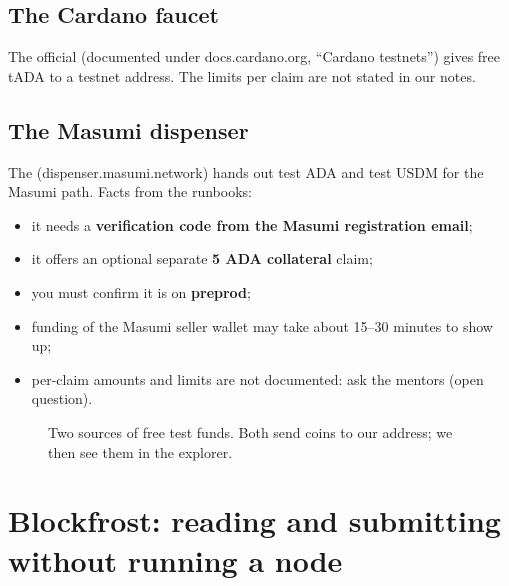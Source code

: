 \subsection{The Cardano faucet}
The official  (documented under docs.cardano.org, ``Cardano testnets'') gives free tADA to a testnet address. The limits per claim are not stated in our notes.

\subsection{The Masumi dispenser}
The  (dispenser.masumi.network) hands out test ADA and test USDM for the Masumi path. Facts from the runbooks:
\begin{itemize}
  \item it needs a \textbf{verification code from the Masumi registration email};
  \item it offers an optional separate \textbf{5 ADA collateral} claim;
  \item you must confirm it is on \textbf{preprod};
  \item funding of the Masumi seller wallet may take about 15--30 minutes to show up;
  \item per-claim amounts and limits are not documented: ask the mentors (open question).
\end{itemize}

\begin{figure}[h]
\centering
{}
\caption{Two sources of free test funds. Both send coins to our address; we then see them in the explorer.}
\end{figure}

\section{Blockfrost: reading and submitting without running a node}

